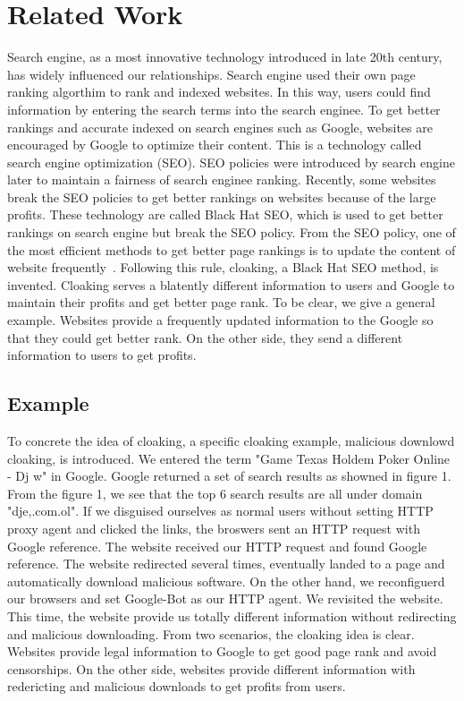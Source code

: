 \section{Related Work}
\label{s:related-work}
Search engine, as a most innovative technology  introduced in late 20th century, has widely influenced our relationships. Search engine used their own page ranking algorthim to rank and indexed websites. In this way, users could find information by entering the search terms into the search enginee. To get better rankings and accurate indexed on search engines such as Google, websites are encouraged by Google to optimize their content. This is a technology called search engine optimization (SEO).
SEO policies were introduced by search engine later to maintain a fairness of search enginee ranking. Recently, some websites break the SEO policies to get better rankings on websites because of the large profits. These technology are called Black Hat SEO, which is used to get better rankings on search engine but break the SEO policy.
From the SEO policy, one of the most efficient methods to get better page rankings is to update the content of website frequently~\cite{wang2011cloak}.
Following this rule, cloaking, a Black Hat SEO method, is invented. Cloaking serves a blatently different information to users and Google to maintain their
profits and get better page rank. To be clear, we give a general example. Websites provide a frequently updated information to the Google so that they could get
better rank. On the other side, they send a different information to users to get profits.

\subsection{Example}
To concrete the idea of cloaking, a specific cloaking example, malicious downlowd cloaking, is introduced. We entered the term "Game
Texas Holdem Poker Online - Dj w" in Google. Google returned a set of search results as showned in figure 1.
From the figure 1, we see that the top 6 search results are all under domain "dje,.com.ol". If we disguised ourselves as normal users without setting HTTP proxy 
agent and clicked the links, the broswers sent an HTTP request with Google reference. The website received our HTTP request and found Google reference. The website
redirected several times, eventually landed to a page and automatically download malicious software. On the other hand, we reconfiguerd our browsers and set
Google-Bot as our HTTP agent. We revisited the website. This time, the website provide us totally different information without redirecting and malicious downloading.
From two scenarios, the cloaking idea is clear. Websites provide legal information to Google to get good page rank and avoid censorships. On the other side,
websites provide different information with redericting and malicious downloads to get profits from users. 

